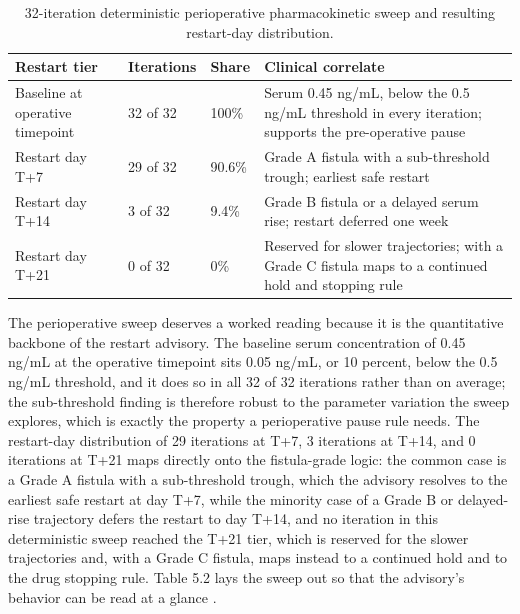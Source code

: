 \clearpage

\begin{table}[t]
\caption{32-iteration deterministic perioperative pharmacokinetic sweep and resulting restart-day distribution.}
\label{tab:sec04-sweep}
\centering
\begin{tabularx}{\textwidth}{L{4.6cm} C{2.4cm} C{2.0cm} Y}
\toprule
\textbf{Restart tier} & \textbf{Iterations} & \textbf{Share} & \textbf{Clinical correlate} \\
\midrule
Baseline at operative timepoint & 32 of 32 & 100\% & Serum 0.45 ng/mL, below the 0.5 ng/mL threshold in every iteration; supports the pre-operative pause \\
Restart day T+7 & 29 of 32 & 90.6\% & Grade A fistula with a sub-threshold trough; earliest safe restart \\
Restart day T+14 & 3 of 32 & 9.4\% & Grade B fistula or a delayed serum rise; restart deferred one week \\
Restart day T+21 & 0 of 32 & 0\% & Reserved for slower trajectories; with a Grade C fistula maps to a continued hold and stopping rule \\
\bottomrule
\end{tabularx}
\vspace{-0.2cm}
\end{table}

\vspace*{-0.895cm}

The perioperative sweep deserves a worked reading because it is the quantitative
backbone of the restart advisory. The baseline serum concentration of 0.45 ng/mL at
the operative timepoint sits 0.05 ng/mL, or 10 percent, below the 0.5 ng/mL
threshold, and it does so in all 32 of 32 iterations rather than on average; the
sub-threshold finding is therefore robust to the parameter variation the sweep
explores, which is exactly the property a perioperative pause rule needs. The
restart-day distribution of 29 iterations at T+7, 3 iterations at T+14, and 0
iterations at T+21 maps directly onto the fistula-grade logic: the common case is a
Grade A fistula with a sub-threshold trough, which the advisory resolves to the
earliest safe restart at day T+7, while the minority case of a Grade B or
delayed-rise trajectory defers the restart to day T+14, and no iteration in this
deterministic sweep reached the T+21 tier, which is reserved for the slower
trajectories and, with a Grade C fistula, maps instead to a continued hold and to
the drug stopping rule. Table 5.2 lays the sweep out so that the advisory's behavior
can be read at a glance \cite{qspmetpancre,fdadigtwinpc,pdacdigtwinp}.



